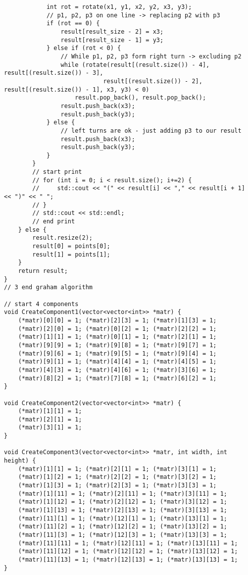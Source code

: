 \documentclass{report}
\begin{document}
\begin{lstlisting}
            int rot = rotate(x1, y1, x2, y2, x3, y3);
            // p1, p2, p3 on one line -> replacing p2 with p3
            if (rot == 0) {
                result[result_size - 2] = x3;
                result[result_size - 1] = y3;
            } else if (rot < 0) {
                // While p1, p2, p3 form right turn -> excluding p2
                while (rotate(result[(result.size()) - 4], result[(result.size()) - 3],
                            result[(result.size()) - 2], result[(result.size()) - 1], x3, y3) < 0)
                    result.pop_back(), result.pop_back();
                result.push_back(x3);
                result.push_back(y3);
            } else {
                // left turns are ok - just adding p3 to our result
                result.push_back(x3);
                result.push_back(y3);
            }
        }
        // start print
        // for (int i = 0; i < result.size(); i+=2) {
        //     std::cout << "(" << result[i] << "," << result[i + 1] << ")" << " ";
        // }
        // std::cout << std::endl;
        // end print
    } else {
        result.resize(2);
        result[0] = points[0];
        result[1] = points[1];
    }
    return result;
}
// 3 end graham algorithm

// start 4 components
void CreateComponent1(vector<vector<int>> *matr) {
    (*matr)[0][0] = 1; (*matr)[2][3] = 1; (*matr)[1][3] = 1;
    (*matr)[2][0] = 1; (*matr)[0][2] = 1; (*matr)[2][2] = 1;
    (*matr)[1][1] = 1; (*matr)[0][1] = 1; (*matr)[2][1] = 1;
    (*matr)[9][9] = 1; (*matr)[9][8] = 1; (*matr)[9][7] = 1;
    (*matr)[9][6] = 1; (*matr)[9][5] = 1; (*matr)[9][4] = 1;
    (*matr)[9][1] = 1; (*matr)[4][4] = 1; (*matr)[4][5] = 1;
    (*matr)[4][3] = 1; (*matr)[4][6] = 1; (*matr)[3][6] = 1;
    (*matr)[8][2] = 1; (*matr)[7][8] = 1; (*matr)[6][2] = 1;
}

void CreateComponent2(vector<vector<int>> *matr) {
    (*matr)[1][1] = 1;
    (*matr)[2][1] = 1;
    (*matr)[3][1] = 1;
}

void CreateComponent3(vector<vector<int>> *matr, int width, int height) {
    (*matr)[1][1] = 1; (*matr)[2][1] = 1; (*matr)[3][1] = 1;
    (*matr)[1][2] = 1; (*matr)[2][2] = 1; (*matr)[3][2] = 1;
    (*matr)[1][3] = 1; (*matr)[2][3] = 1; (*matr)[3][3] = 1;
    (*matr)[1][11] = 1; (*matr)[2][11] = 1; (*matr)[3][11] = 1;
    (*matr)[1][12] = 1; (*matr)[2][12] = 1; (*matr)[3][12] = 1;
    (*matr)[1][13] = 1; (*matr)[2][13] = 1; (*matr)[3][13] = 1;
    (*matr)[11][1] = 1; (*matr)[12][1] = 1; (*matr)[13][1] = 1;
    (*matr)[11][2] = 1; (*matr)[12][2] = 1; (*matr)[13][2] = 1;
    (*matr)[11][3] = 1; (*matr)[12][3] = 1; (*matr)[13][3] = 1;
    (*matr)[11][11] = 1; (*matr)[12][11] = 1; (*matr)[13][11] = 1;
    (*matr)[11][12] = 1; (*matr)[12][12] = 1; (*matr)[13][12] = 1;
    (*matr)[11][13] = 1; (*matr)[12][13] = 1; (*matr)[13][13] = 1;
}




\end{lstlisting}
\end{document}
